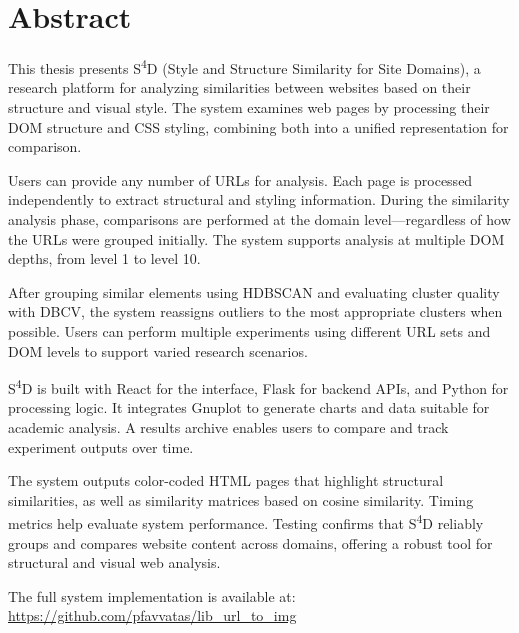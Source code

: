 \newpage
{}
\chapter*{Abstract}

This thesis presents S\textsuperscript{4}D (Style and Structure Similarity for Site Domains), a research platform for analyzing similarities between websites based on their structure and visual style. The system examines web pages by processing their DOM structure and CSS styling, combining both into a unified representation for comparison.

Users can provide any number of URLs for analysis. Each page is processed independently to extract structural and styling information. During the similarity analysis phase, comparisons are performed at the domain level—regardless of how the URLs were grouped initially. The system supports analysis at multiple DOM depths, from level 1 to level 10.

After grouping similar elements using HDBSCAN and evaluating cluster quality with DBCV, the system reassigns outliers to the most appropriate clusters when possible. Users can perform multiple experiments using different URL sets and DOM levels to support varied research scenarios.

S\textsuperscript{4}D is built with React for the interface, Flask for backend APIs, and Python for processing logic. It integrates Gnuplot to generate charts and data suitable for academic analysis. A results archive enables users to compare and track experiment outputs over time.

The system outputs color-coded HTML pages that highlight structural similarities, as well as similarity matrices based on cosine similarity. Timing metrics help evaluate system performance. Testing confirms that S\textsuperscript{4}D reliably groups and compares website content across domains, offering a robust tool for structural and visual web analysis.

The full system implementation is available at: \url{https://github.com/pfavvatas/lib_url_to_img}
